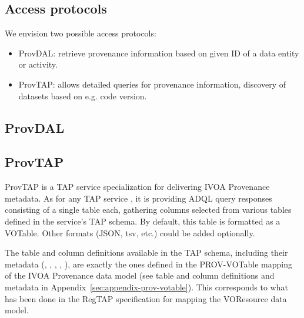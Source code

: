 \subsection{Access protocols}
\label{sec:access_protocols}
We envision two possible access protocols:
\begin{itemize}
\item ProvDAL: retrieve provenance information based on given ID of a data entity or activity.
\item ProvTAP: allows detailed queries for provenance information, discovery of datasets based on e.g. code version.
\end{itemize}

\subsection{ProvDAL}



\subsection{ProvTAP}
ProvTAP is a TAP service specialization for delivering IVOA Provenance metadata.
As for any TAP service \citep{std:TAP}, it is providing ADQL query responses
consisting of a single table each, gathering columns selected from various
tables defined in the service's TAP schema. By default, this table is formatted
as a VOTable. Other formats (JSON, tsv, etc.) could be added optionally.

The table and column definitions available in the TAP schema, including their
metadata (, , , , ), are exactly the ones defined
in the PROV-VOTable mapping of the IVOA Provenance data model (see table and
column definitions and metadata in Appendix~\ref{sec:appendix-prov-votable}).
This corresponds to what has been done in the RegTAP specification
\citep{std:RegTAP} for mapping the VOResource data model.


